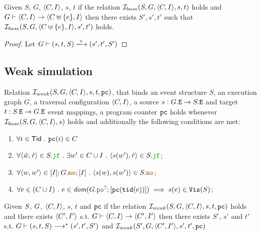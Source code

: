 \documentclass[12pt]{article}
\begin{document}
\begin{lemma}
  Given $S$, $G$, $\langle C, I \rangle$, $s$, $t$
  if the relation $\mathcal{I}_{base}(S, G, \langle C, I \rangle, s, t)$ holds and
  $G \vdash \langle C, I \rangle \rightarrow \langle C \uplus \{e\}, I \rangle$ then
  there exists $S', s', t'$ such that $\mathcal{I}_{base}(S, G, \langle C \uplus \{e\}, I \rangle, s', t')$ holds.
\end{lemma}

\begin{proof}
  Let $G \vdash (s, t, S) \ESstep{e} (s', t', S')$
\end{proof}

\subsection{Weak simulation}

\begin{definition}
  Relation $\mathcal{I}_{weak}(S, G, \langle C, I \rangle, s, t, {\mathtt{pc}})$, that binds an 
  event structure $S$, an \imm execution graph $G$,
  a traversal configuration $\langle C, I \rangle$,
  a source $s : G.{\mathtt{E}} \rightarrow S.{\mathtt{E}}$ and target $t : S.{\mathtt{E}} \rightarrow G.{\mathtt{E}}$ event mappings,
  a program counter ${\mathtt{pc}}$
  holds whenever $\mathcal{I}_{base}(S, G, \langle C, I \rangle, s)$ holds and
  additionally the following conditions are met:
  \begin{enumerate}[label=\textbf{S.\arabic*},start=6]

    \item \label{item:sim-pc}
      $\forall{i \in \mathsf{Tid}} ~.~ {\mathtt{pc}}(i) \in C$



    


    \item \label{item:sim-jf}
      $
      \forall{\tup{\hat{w}, \hat{r}} \in \lES.\lJF} ~.~
      \exists{w' \in \lC \cup \lI} ~.~ \tup{s(w'), \hat{r}} \in \lES.\lJF
      $;



    \item \label{item:sim-mo}
      $\forall{\tup{w, w'} \in [\lI];\lG.\lMO;[\lI]} ~.~ \tup{s(w), s(w')} \in \lES.\lMO$;
      
    \item \label{item:sim-vis-weak}
      $\forall{e \in (C \cup I)} ~.~
      e \in \dom{G.\lPO^?;[\lPC(\lTID(e))]} \implies s(e) \in \lVIS(S)$;

  \end{enumerate}
\end{definition}


\begin{lemma}
  Given $S$, $G$, $\langle C, I \rangle$, $s$, $t$ and ${\mathtt{pc}}$
  if the relation $\mathcal{I}_{weak}(S, G, \langle C, I \rangle, s, t, {\mathtt{pc}})$ holds and 
  there exists $\langle C', I' \rangle$
  s.t. $G \vdash \langle C, I \rangle \rightarrow \langle C', I' \rangle$
  then there exists $S'$, $s'$ and $t'$ s.t. $G \vdash (s, t, S) \longrightarrow^* (s', t', S')$
  and $\mathcal{I}_{weak}(S', G, \langle C', I' \rangle, s', t', {\mathtt{pc}})$ 
\end{lemma}
\end{document}
